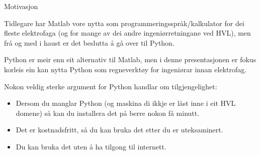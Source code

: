 \begin{frame}{Motivasjon}

  Tidlegare har Matlab vore nytta som programmeringsspråk/kalkulator for dei fleste elektrofaga (og for mange av dei andre ingeniørretningane ved HVL), men frå og med i haust er det beslutta å gå over til Python.

  Python er meir enn eit alternativ til Matlab, men i denne presentasjonen er fokus korleis ein kan nytta Python som regneverktøy for ingeniørar innan elektrofag.

  Nokon veldig sterke argument for Python handlar om tilgjengelighet:
  \begin{itemize}
    \item Dersom du manglar Python (og maskina di ikkje er låst inne i eit HVL domene) så kan du installera det på berre nokon få minutt.
    \item Det er kostnadsfritt, så du kan bruka det etter du er uteksaminert.
    \item Du kan bruka det uten å ha tilgong til internett.
  \end{itemize}

  
\end{frame}
